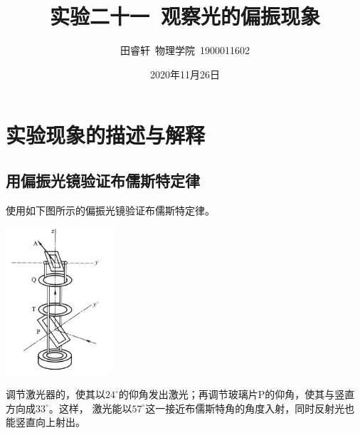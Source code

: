 \documentclass{article}
\title{\heiti 实验二十一\ 观察光的偏振现象}
\author{\kaishu 田睿轩\ 物理学院\ 1900011602}
\date{2020年11月26日}
\newcommand{\degree}{^\circ}
\begin{document}
    \maketitle

    \section{实验现象的描述与解释}
    \subsection{用偏振光镜验证布儒斯特定律}
    使用如下图所示的偏振光镜验证布儒斯特定律。
    
    \begin{center}
        \includegraphics[width=0.3\textwidth]{偏振光镜.jpg}
    \end{center}

    调节激光器的，使其以$24\degree$的仰角发出激光；再调节玻璃片P的仰角，使其与竖直方向成$33\degree$。这样，
    激光能以$57\degree$这一接近布儒斯特角的角度入射，同时反射光也能竖直向上射出。
\end{document}
